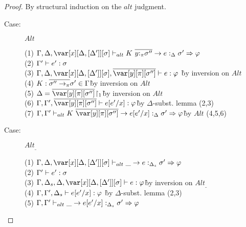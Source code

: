 \begin{proof}
By structural induction on the $alt$ judgment.

\begin{description}
\item[Case:] $Alt$
\begin{tabbing}
    (1) $\G, \D, \xD \vdash_{alt} K~\ov{y{:}_\pi\s''} \to e :_\Delta \s' \Rightarrow \vp$\\
    (2) $\Gamma' \vdash e' : \sigma$\\
    (3) $\G, \D, \xD, \ov{\y[\pi][\s'']} \vdash e : \vp$ \` by inversion on $Alt$\\
    (4) $K : \overline{\sigma'' \to_\pi} \sigma' \in \Gamma$\` by inversion on $Alt$\\
    (5) $\D = \ov{\y[\pi][\s'']}\!\upharpoonright_1$\` by inversion on $Alt$\\
    (6) $\G,\G',\ov{\y[\pi][\s'']} \vdash e[e'/x] : \vp$\` by $\Delta$-subst. lemma (2,3)\\
    (7) $\G, \G' \vdash_{alt} K~\ov{\y[\pi][\s'']} \to e[e'/x] :_\Delta \s' \Rightarrow \vp$\` by $Alt$ (4,5,6)\\
\end{tabbing}

\item[Case:] $Alt_\_$
\begin{tabbing}
    (1) $\G, \D, \xD \vdash_{alt} \_ \to e :_{\Delta_s} \s' \Rightarrow \vp$\\
    (2) $\Gamma' \vdash e' : \sigma$\\
    (3) $\G, \D_s, \D, \xD \vdash e : \vp$\` by inversion on $Alt_\_$\\
    (4) $\Gamma, \Gamma', \Delta_s \vdash e[e'/x] : \varphi$ \` by $\Delta$-subst. lemma (2,3)\\
    (5) $\Gamma ,\Gamma' \vdash_{alt} \_ \to e[e'/x] :_{\Delta_s} \sigma' \Rightarrow \varphi$\\
\end{tabbing}
\end{description}

\end{proof}

